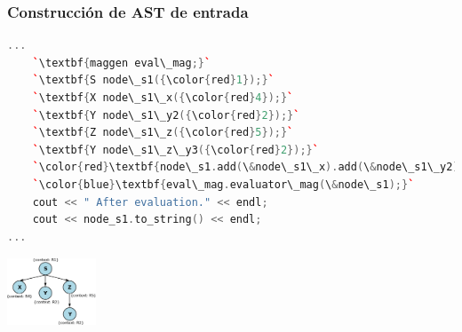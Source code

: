 \documentclass[10pt, xcolor=table]{beamer}
\begin{document}
\begin{frame}[fragile]
\frametitle{Construcción de AST de entrada}

\begin{lstlisting}[columns=fullflexible, basicstyle=\scriptsize, language=c++]
...     
    `\textbf{maggen eval\_mag;}`
    `\textbf{S node\_s1({\color{red}1});}`
    `\textbf{X node\_s1\_x({\color{red}4});}`
    `\textbf{Y node\_s1\_y2({\color{red}2});}`
    `\textbf{Z node\_s1\_z({\color{red}5});}`
    `\textbf{Y node\_s1\_z\_y3({\color{red}2});}`
    `\color{red}\textbf{node\_s1.add(\&node\_s1\_x).add(\&node\_s1\_y2).add(\&(node\_s1\_z.add(\&node\_s1\_z\_y3)));}`
    `\color{blue}\textbf{eval\_mag.evaluator\_mag(\&node\_s1);}`
    cout << " After evaluation." << endl;
    cout << node_s1.to_string() << endl;
...
\end{lstlisting}

\begin{center}
\includegraphics[width=100px, height=76px]{./ast.png}
\end{center}

\end{frame}


\end{document}
